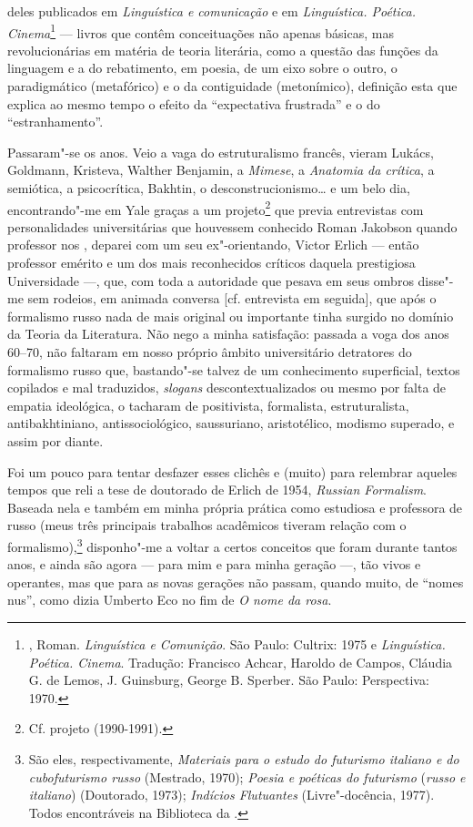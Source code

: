 deles publicados em \emph{Linguística e comunicação} e em
\emph{Linguística. Poética. Cinema}\footnote{, Roman.
 \emph{Linguística e Comunição}. São Paulo: Cultrix: 1975 e
 \emph{Linguística. Poética. Cinema}. Tradução: Francisco Achcar, 
Haroldo de Campos, Cláudia G. de Lemos, J. Guinsburg, George B.
 Sperber. São Paulo: Perspectiva: 1970.} --- livros que contêm conceituações
não apenas básicas, mas revolucionárias em matéria de teoria literária,
como a questão das funções da linguagem e a do rebatimento, em poesia, de
um eixo sobre o outro, o paradigmático (metafórico) e o da contiguidade
(metonímico), definição esta que explica ao mesmo tempo o efeito da
``expectativa frustrada'' e o do ``estranhamento''.

Passaram"-se os anos. Veio a vaga do estruturalismo francês, vieram
Lukács, Goldmann, Kristeva, Walther Benjamin, a \emph{Mimese}, a
\emph{Anatomia da crítica}, a semiótica, a psicocrítica, Bakhtin, o
desconstrucionismo\ldots{} e um belo dia, encontrando"-me em Yale graças a um
projeto\footnote{Cf. projeto  (1990-1991).} que previa
entrevistas com personalidades universitárias que houvessem conhecido
Roman Jakobson quando professor nos , deparei com um seu
ex"-orientando, Victor Erlich --- então professor emérito e um dos mais
reconhecidos críticos daquela prestigiosa Universidade ---, que, com toda
a autoridade que pesava em seus ombros disse"-me sem rodeios, em animada
conversa [cf. entrevista em seguida], que após o formalismo russo nada de mais
original ou importante tinha surgido no domínio da Teoria da Literatura.
Não nego a minha satisfação: passada a voga dos anos 60--70, não faltaram
em nosso próprio âmbito universitário detratores do formalismo russo
que, bastando"-se talvez de um conhecimento superficial, textos
copilados e mal traduzidos, \emph{slogans} descontextualizados ou mesmo por
falta de empatia ideológica, o tacharam de positivista, formalista,
estruturalista, antibakhtiniano, antissociológico, saussuriano,
aristotélico, modismo superado, e assim por diante.

Foi um pouco para tentar desfazer esses clichês e (muito) para relembrar aqueles tempos
que reli a tese de doutorado de Erlich de 1954, \emph{Russian
Formalism}. Baseada nela e também em minha própria prática como
estudiosa e professora de russo (meus três principais trabalhos
acadêmicos tiveram relação com o formalismo),\footnote{São eles,
  respectivamente, \emph{Materiais para o estudo do futurismo italiano e
  do cubofuturismo russo} (Mestrado, 1970); \emph{Poesia e poéticas do
  futurismo} (\emph{russo e italiano}) (Doutorado, 1973); \emph{Indícios
  Flutuantes} (Livre"-docência, 1977). Todos encontráveis na Biblioteca
  da .} disponho"-me a voltar a certos conceitos que foram durante
tantos anos, e ainda são agora --- para mim e para minha geração ---, tão
vivos e operantes, mas que para as novas gerações não passam, quando
muito, de ``nomes nus'', como dizia Umberto Eco no fim de \emph{O nome
da rosa}.



